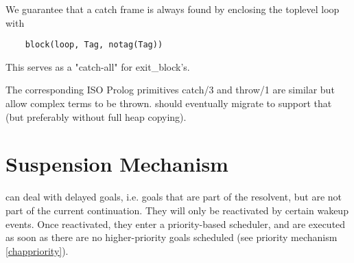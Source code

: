 We guarantee that a catch frame is always found by enclosing
the toplevel loop with
\begin{verbatim}
    block(loop, Tag, notag(Tag))
\end{verbatim}
This serves as a "catch-all" for exit_block's.

The corresponding ISO Prolog primitives catch/3 and throw/1 are similar
but allow complex terms to be thrown. {\eclipse} should eventually migrate
to support that (but preferably without full heap copying).



\section{Suspension Mechanism}

{\eclipse} can deal with delayed goals, i.e. goals that are part of the
resolvent, but are not part of the current continuation. They will only
be reactivated by certain wakeup events. Once reactivated, they enter
a priority-based scheduler, and are executed as soon as there are no
higher-priority goals scheduled (see priority mechanism \ref{chappriority}).


